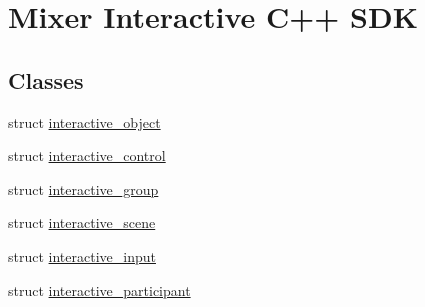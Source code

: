 \hypertarget{group___interactivity}{}\section{Mixer Interactive C++ S\+DK}
\label{group___interactivity}
\subsection*{Classes}
\begin{DoxyCompactItemize}
\item 
struct \mbox{\hyperlink{structinteractive__object}{interactive\+\_\+object}}
\item 
struct \mbox{\hyperlink{structinteractive__control}{interactive\+\_\+control}}
\item 
struct \mbox{\hyperlink{structinteractive__group}{interactive\+\_\+group}}
\item 
struct \mbox{\hyperlink{structinteractive__scene}{interactive\+\_\+scene}}
\item 
struct \mbox{\hyperlink{structinteractive__input}{interactive\+\_\+input}}
\item 
struct \mbox{\hyperlink{structinteractive__participant}{interactive\+\_\+participant}}
\end{DoxyCompactItemize}
